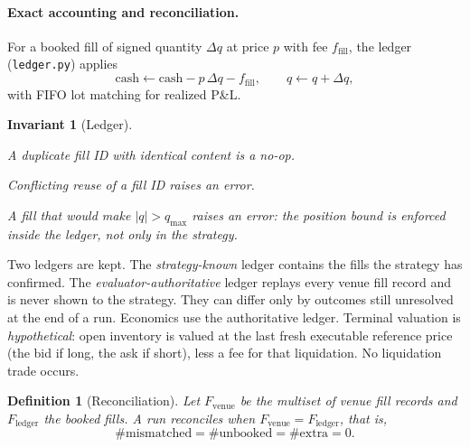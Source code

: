 \documentclass[11pt]{article}
\newtheorem{definition}{Definition}
\newtheorem{invariant}{Invariant}
\theoremstyle{remark}
\newcommand{\code}[1]{\texttt{#1}}
\begin{document}
\paragraph{Exact accounting and reconciliation.}

For a booked fill of signed quantity $\Delta q$ at price $p$ with fee $f_{\text{fill}}$, the
ledger (\code{ledger.py}) applies
\begin{equation}
  \text{cash} \leftarrow \text{cash} - p\,\Delta q - f_{\text{fill}},
  \qquad
  q \leftarrow q + \Delta q,
\end{equation}
with FIFO lot matching for realized P\&L.

\begin{invariant}[Ledger]
\begin{enumerate*}[label=(\roman*)]
  \item A duplicate fill ID with identical content is a no-op.
  \item Conflicting reuse of a fill ID raises an error.
  \item A fill that would make $|q| > q_{\max}$ raises an error: the position bound is enforced
        inside the ledger, not only in the strategy.
\end{enumerate*}
\end{invariant}

Two ledgers are kept. The \emph{strategy-known} ledger contains the fills the strategy has
confirmed. The \emph{evaluator-authoritative} ledger replays every venue fill record and is
never shown to the strategy. They can differ only by outcomes still unresolved at the end of a
run. Economics use the authoritative ledger. Terminal valuation is \emph{hypothetical}: open
inventory is valued at the last fresh executable reference price (the bid if long, the ask if
short), less a fee for that liquidation. No liquidation trade occurs.

\begin{definition}[Reconciliation]
Let $F_{\text{venue}}$ be the multiset of venue fill records and $F_{\text{ledger}}$ the booked
fills. A run reconciles when $F_{\text{venue}} = F_{\text{ledger}}$, that is,
\[
  \#\text{mismatched} = \#\text{unbooked} = \#\text{extra} = 0 .
\]
\end{definition}

\end{document}
